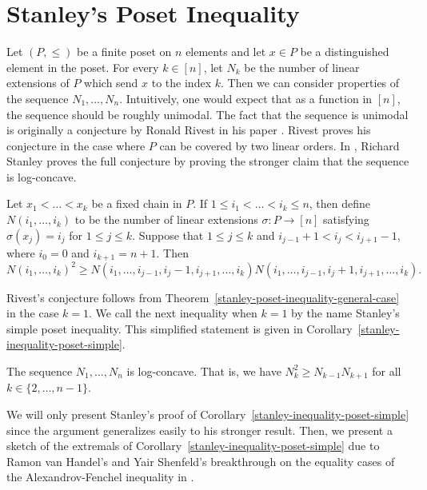 \documentclass{puthesis-UG}
\begin{document}
\section{Stanley's Poset Inequality} \label{stanley-poset-inequality}

Let $(P, \leq)$ be a finite poset on $n$ elements and let $x \in P$ be a distinguished element in the poset. For every $k \in [n]$, let $N_k$ be the number of linear extensions of $P$ which send $x$ to the index $k$. Then we can consider properties of the sequence $N_1, \ldots, N_n$. Intuitively, one would expect that as a function in $[n]$, the sequence should be roughly unimodal. The fact that the sequence is unimodal is originally a conjecture by Ronald Rivest in his paper \cite{stanley-poset-inequality-origin}. Rivest proves his conjecture in the case where $P$ can be covered by two linear orders. In \cite{STANLEY}, Richard Stanley proves the full conjecture by proving the stronger claim that the sequence is log-concave.

\begin{thm} \label{stanley-poset-inequality-general-case}
	Let $x_1 < \ldots < x_k$ be a fixed chain in $P$. If $1 \leq i_1 < \ldots < i_k \leq n$, then define $N(i_1, \ldots, i_k)$ to be the number of linear extensions $\sigma : P \to [n]$ satisfying $\sigma (x_j) = i_j$ for $1 \leq j \leq k$. Suppose that $1 \leq j \leq k$ and $i_{j-1} + 1 < i_j < i_{j+1} - 1$, where $i_0 = 0$ and $i_{k+1} = n+1$. Then 
	\[
		N(i_1, \ldots, i_k)^2 \geq N(i_1, \ldots, i_{j-1}, i_j - 1, i_{j+1}, \ldots, i_k) N(i_1, \ldots, i_{j-1}, i_j + 1, i_{j+1}, \ldots, i_k).
	\]
\end{thm}

Rivest's conjecture follows from Theorem~\ref{stanley-poset-inequality-general-case} in the case $k = 1$. We call the next inequality when $k = 1$ by the name Stanley's simple poset inequality. This simplified statement is given in Corollary~\ref{stanley-inequality-poset-simple}.  

\begin{cor} \label{stanley-inequality-poset-simple}
	The sequence $N_1, \ldots, N_n$ is log-concave. That is, we have $N_k^2 \geq N_{k-1}N_{k+1}$ for all $k \in \{2, \ldots, n-1\}.$
\end{cor}

We will only present Stanley's proof of Corollary~\ref{stanley-inequality-poset-simple} since the argument generalizes easily to his stronger result. Then, we present a sketch of the extremals of Corollary~\ref{stanley-inequality-poset-simple} due to Ramon van Handel's and Yair Shenfeld's breakthrough on the equality cases of the Alexandrov-Fenchel inequality in \cite{shenfeld2022extremals}. 
\end{document}
